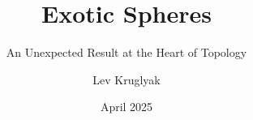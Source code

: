 \documentclass{lkx_thesis}
\title{Exotic Spheres}
\subtitle{An Unexpected Result at the Heart of Topology}
\author{Lev Kruglyak}
\date{April 2025}
\begin{document}
% 

\lkxtoc



% 
%
%
% 
% 
% 
%
%
% 
% 
% 
% 
%

\lkxrefs
\lkxindex
\end{document}
